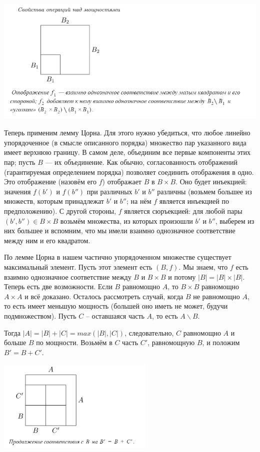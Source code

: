 \begin{center}
    \includegraphics[width=14cm]{images/2.12 1.png}
\end{center}

Теперь применим лемму Цорна. Для этого нужно убедиться, что любое линейно упорядоченное (в смысле описанного порядка) множество пар указанного вида имеет верхнюю границу. В самом деле, объединим все первые компоненты этих пар; пусть $B$ — их объединение. Как обычно, согласованность отображений (гарантируемая определением порядка) позволяет соединить отображения в одно. Это отображение (назовём его $f$) отображает $B$ в $B \times B$. Оно будет инъекцией: значения $f(b')$ и $f(b'')$ при различных $b'$ и $b''$ различны (возьмем большее из множеств, которым принадлежат $b'$ и $b''$; на нём $f$ является инъекцией по предположению). С другой стороны, $f$ является сюръекцией: для любой пары $(b', b'') \in B \times B$ возьмём множества, из которых произошли $b'$ и $b''$, выберем из них большее и вспомним, что мы имели взаимно однозначное соответствие между ним и его квадратом.

По лемме Цорна в нашем частично упорядоченном множестве существует максимальный элемент. Пусть этот элемент есть $(B, f)$. Мы знаем, что $f$ есть взаимно однозначное соответствие между $B$ и $B \times B$ и потому $|B| = |B| \times |B|$. Теперь есть две возможности. Если $B$ равномощно $A$, то $B \times B$ равномощно $A \times A$ и всё доказано. Осталось рассмотреть случай, когда $B$ не равномощно $A$, то есть имеет меньшую мощность (большей оно иметь не может, будучи подмножеством). Пусть $C$ -- оставшаяся часть $A$, то есть $A \backslash B$.

Тогда $|A| = |B| + |C| = max(|B|, |C|)$, следовательно, $C$ равномощно $A$ и больше $B$ по мощности. Возьмём в $C$ часть $C'$, равномощную $B$, и положим $B' = B + C'$.

\begin{center}
    \includegraphics[width=7.5cm]{images/2.12 2.png}
\end{center}

